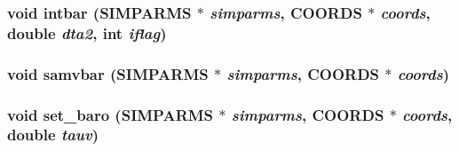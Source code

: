 \subsubsection{\setlength{\rightskip}{0pt plus 5cm}void intbar ({\bf SIMPARMS} $\ast$ {\em simparms}, {\bf COORDS} $\ast$ {\em coords}, double {\em dta2}, int {\em iflag})}\label{thomas_2md__baro_8c_dc8a3b70853b7fac5ee77bb389205afb}


\subsubsection{\setlength{\rightskip}{0pt plus 5cm}void samvbar ({\bf SIMPARMS} $\ast$ {\em simparms}, {\bf COORDS} $\ast$ {\em coords})}\label{thomas_2md__baro_8c_fabc38b1f16b28ba02a6112e4c2cb433}


\subsubsection{\setlength{\rightskip}{0pt plus 5cm}void set\_\-baro ({\bf SIMPARMS} $\ast$ {\em simparms}, {\bf COORDS} $\ast$ {\em coords}, double {\em tauv})}\label{thomas_2md__baro_8c_d72b222d3469248fbdede94c4961c53d}


